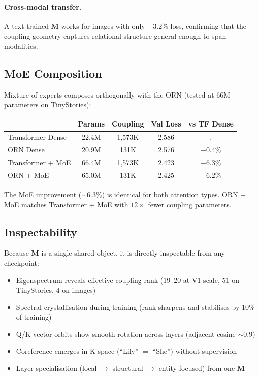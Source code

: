 \documentclass[11pt, a4paper]{article}
\newcommand{\M}{\mathbf{M}}
\theoremstyle{plain}
\theoremstyle{remark}
\begin{document}
\paragraph{Cross-modal transfer.}
A text-trained $\M$ works for images with only $+3.2\%$ loss, confirming that the coupling geometry captures relational structure general enough to span modalities.

\subsection{MoE Composition}

Mixture-of-experts composes orthogonally with the ORN (tested at 66M parameters on TinyStories):

\begin{center}\small
\begin{tabular}{@{}lcccc@{}}
\toprule
& \textbf{Params} & \textbf{Coupling} & \textbf{Val Loss} & \textbf{vs TF Dense} \\
\midrule
Transformer Dense & 22.4M & 1,573K & 2.586 & ,  \\
ORN Dense & 20.9M & 131K & 2.576 & $-0.4\%$ \\
Transformer + MoE & 66.4M & 1,573K & 2.423 & $-6.3\%$ \\
ORN + MoE & 65.0M & 131K & 2.425 & $-6.2\%$ \\
\bottomrule
\end{tabular}
\end{center}

The MoE improvement (${\sim}6.3\%$) is identical for both attention types.
ORN + MoE matches Transformer + MoE with $12\times$ fewer coupling parameters.

\subsection{Inspectability}

Because $\M$ is a single shared object, it is directly inspectable from any checkpoint:
\begin{itemize}[nosep]
    \item Eigenspectrum reveals effective coupling rank (19--20 at V1 scale, 51 on TinyStories, 4 on images)
    \item Spectral crystallisation during training (rank sharpens and stabilises by 10\% of training)
    \item Q/K vector orbits show smooth rotation across layers (adjacent cosine ${\sim}0.9$)
    \item Coreference emerges in K-space (``Lily'' $=$ ``She'') without supervision
    \item Layer specialisation (local $\to$ structural $\to$ entity-focused) from one $\M$
\end{itemize}
\end{document}
